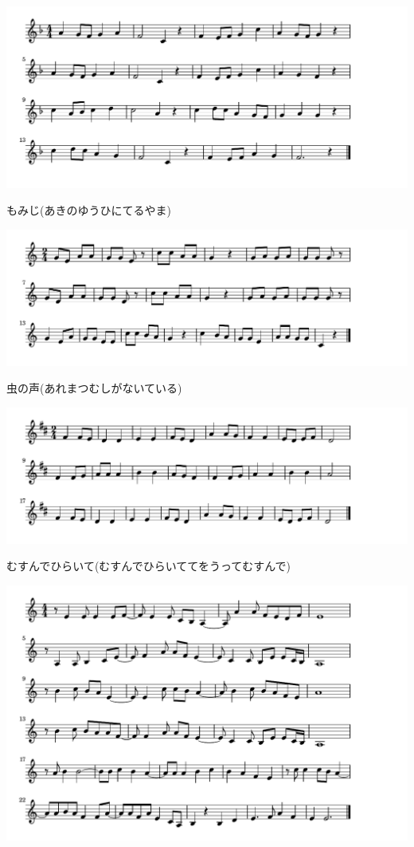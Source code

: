 \documentclass[a4paper]{ltjsarticle}
\begin{document}
\includegraphics[clip]{momiji_crop.pdf}

\vspace{-10mm} \hspace{10mm}
もみじ(あきのゆうひにてるやま)



\includegraphics[clip]{mushinokoe_crop.pdf}

\vspace{-10mm} \hspace{10mm}
虫の声(あれまつむしがないている)



\includegraphics[clip]{musunde_crop.pdf}

\vspace{-10mm} \hspace{10mm}
むすんでひらいて(むすんでひらいててをうってむすんで)



\includegraphics[clip]{nangoku_crop.pdf}
\end{document}
